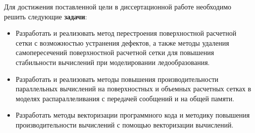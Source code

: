 Для достижения поставленной цели в диссертационной работе необходимо решить следующие \textbf{задачи}:
\begin{itemize}[noitemsep,topsep=0pt,parsep=0pt,partopsep=0pt]
\item Разработать и реализовать метод перестроения поверхностной расчетной сетки с возможностью устранения дефектов, а также методы удаления самопересечений поверхностной расчетной сетки для повышения стабильности вычислений при моделировании ледообразования.
\item Разработать и реализовать методы повышения производительности параллельных вычислений на поверхностных и объемных расчетных сетках в моделях распараллеливания с передачей сообщений и на общей памяти.
\item Разработать методы векторизации программного кода и методику повышения производительности вычислений с помощью векторизации вычислений.
\end{itemize}